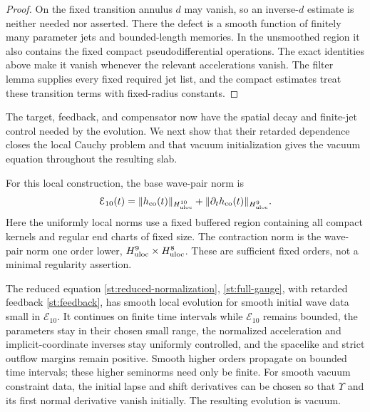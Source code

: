 \begin{proof}
On the fixed transition annulus \(d\) may vanish, so an inverse-\(d\) estimate is neither needed nor asserted. There the defect is a smooth function of finitely many parameter jets and bounded-length memories. In the unsmoothed region it also contains the fixed compact pseudodifferential operations. The exact identities above make it vanish whenever the relevant accelerations vanish. The filter lemma supplies every fixed required jet list, and the compact estimates treat these transition terms with fixed-radius constants.

\end{proof}

The target, feedback, and compensator now have the spatial decay and
finite-jet control needed by the evolution. We next show that their
retarded dependence closes the local Cauchy problem and that vacuum
initialization gives the vacuum equation throughout the resulting slab.

For this local construction, the base wave-pair norm is
\[
 \mathcal E_{10}(t)=\|h_{\rm co}(t)\|_{H^{10}_{\rm uloc}}
                 +\|\partial_t h_{\rm co}(t)\|_{H^9_{\rm uloc}}.
\]
Here the uniformly local norms use a fixed buffered region containing
all compact kernels and regular end charts of fixed size. The contraction
norm is the wave-pair norm one order lower, $H^9_{\rm uloc}\times
H^8_{\rm uloc}$. These are sufficient fixed orders, not a minimal
regularity assertion.

\begin{proposition}
\label{st:local-evolution}
The reduced equation
\eqref{st:reduced-normalization},
\eqref{st:full-gauge}, with retarded feedback
\eqref{st:feedback}, has smooth local evolution for smooth
initial wave data small in $\mathcal E_{10}$.
It continues on finite time intervals while $\mathcal E_{10}$ remains
bounded, the parameters stay in their chosen small range, the normalized
acceleration and implicit-coordinate inverses stay uniformly controlled,
and the spacelike and strict outflow margins remain positive.
Smooth higher orders propagate on bounded time intervals;
these higher seminorms need only be finite.
For smooth vacuum constraint data, the initial lapse and shift
derivatives can be chosen so that $\Upsilon$ and its first
normal derivative vanish initially.  The resulting evolution
is vacuum.
\end{proposition}

